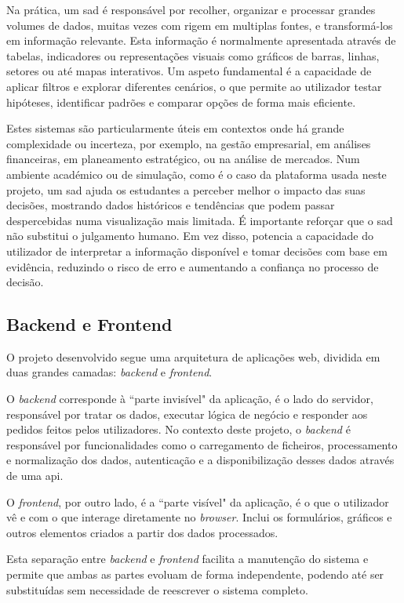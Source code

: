Na prática, um \gls{sad} é responsável por recolher, organizar e processar grandes volumes de dados, muitas vezes com rigem em multiplas fontes, e transformá-los em informação relevante. Esta informação é normalmente apresentada através de tabelas, indicadores ou representações visuais como gráficos de barras, linhas, setores ou até mapas interativos. Um aspeto fundamental é a capacidade de aplicar filtros e explorar diferentes cenários, o que permite ao utilizador testar hipóteses, identificar padrões e comparar opções de forma mais eficiente.

Estes sistemas são particularmente úteis em contextos onde há grande complexidade ou incerteza, por exemplo, na gestão empresarial, em análises financeiras, em planeamento estratégico, ou na análise de mercados. Num ambiente académico ou de simulação, como é o caso da plataforma usada neste projeto, um \gls{sad} ajuda os estudantes a perceber melhor o impacto das suas decisões, mostrando dados históricos e tendências que podem passar despercebidas numa visualização mais limitada.
É importante reforçar que o \gls{sad} não substitui o julgamento humano. Em vez disso, potencia a capacidade do utilizador de interpretar a informação disponível e tomar decisões com base em evidência, reduzindo o risco de erro e aumentando a confiança no processo de decisão.

\subsection{Backend e Frontend}

O projeto desenvolvido segue uma arquitetura de aplicações web, dividida em duas grandes camadas: \textit{backend} e \textit{frontend}.

O \textit{backend} corresponde à ``parte invisível" da aplicação, é o lado do servidor, responsável por tratar os dados, executar lógica de negócio e responder aos pedidos feitos pelos utilizadores. No contexto deste projeto, o \textit{backend} é responsável por funcionalidades como o carregamento de ficheiros, processamento e normalização dos dados, autenticação e a disponibilização desses dados através de uma \gls{api}.

O \textit{frontend}, por outro lado, é a ``parte visível" da aplicação, é o que o utilizador vê e com o que interage diretamente no \textit{browser}. Inclui os formulários, gráficos e outros elementos criados a partir dos dados processados.

Esta separação entre \textit{backend} e \textit{frontend} facilita a manutenção do sistema e permite que ambas as partes evoluam de forma independente, podendo até ser substituídas sem necessidade de reescrever o sistema completo.

